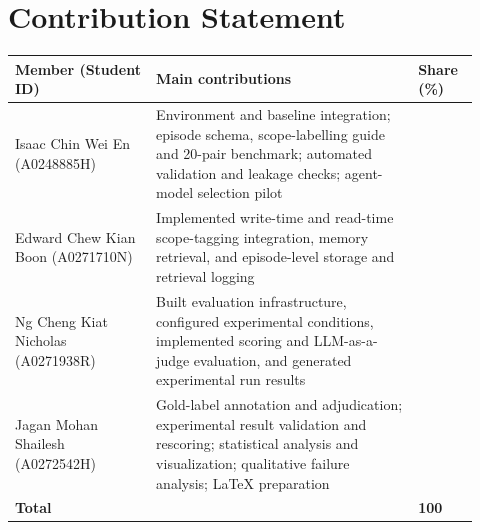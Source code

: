 \section*{Contribution Statement}

\begin{center}
\begin{tabular}{@{}>{\raggedright\arraybackslash}p{0.28\linewidth}
                >{\raggedright\arraybackslash}p{0.52\linewidth}
                >{\centering\arraybackslash}p{0.12\linewidth}@{}}
\toprule
\textbf{Member (Student ID)} & \textbf{Main contributions} & \textbf{Share (\%)} \\
\midrule
Isaac Chin Wei En (A0248885H) &
Environment and baseline integration; episode schema, scope-labelling
guide and 20-pair benchmark; automated validation and leakage checks;
agent-model selection pilot & 25 \\
Edward Chew Kian Boon (A0271710N) &
Implemented write-time and read-time scope-tagging integration, memory
retrieval, and episode-level storage and retrieval logging & 25 \\
Ng Cheng Kiat Nicholas (A0271938R) &
Built evaluation infrastructure, configured experimental conditions,
implemented scoring and LLM-as-a-judge evaluation, and generated
experimental run results & 25 \\
Jagan Mohan Shailesh (A0272542H) &
Gold-label annotation and adjudication; experimental result validation
and rescoring; statistical analysis and visualization; qualitative
failure analysis; \LaTeX{} preparation & 25 \\
\midrule
\textbf{Total} & & \textbf{100} \\
\bottomrule
\end{tabular}
\end{center}
